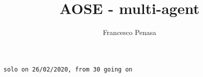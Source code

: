 \documentclass[11pt]{article}
\begin{document}
\author{Francesco Penasa}
\title{AOSE - multi-agent}
\maketitle

\medskip

\texttt{solo on 26/02/2020, from 30 going on}
\end{document}

